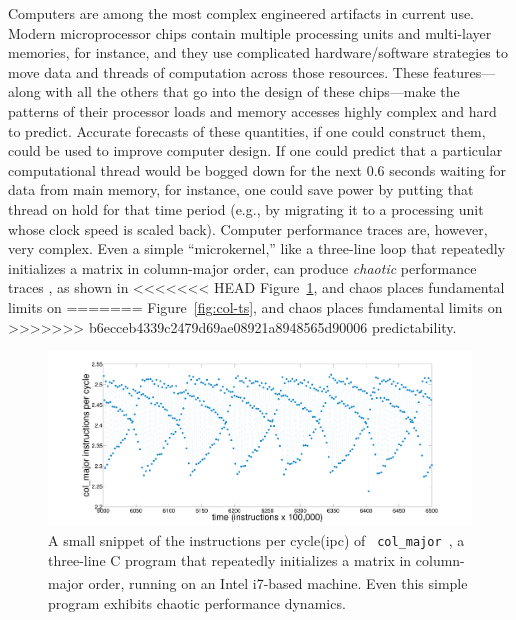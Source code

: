 \documentclass{article}
\newcommand{\col}{{\tt col\_major}~}
\begin{document}
Computers are among the most complex engineered artifacts in current
use.  Modern microprocessor chips contain multiple processing units
and multi-layer memories, for instance, and they use complicated
hardware/software strategies to move data and threads of computation
across those resources.  These features---along with all the others
that go into the design of these chips---make the patterns of their
processor loads and memory accesses highly complex and hard to
predict.  Accurate forecasts of these quantities, if one could
construct them, could be used to improve computer design.  If one
could predict that a particular computational thread would be bogged
down for the next 0.6 seconds waiting for data from main memory, for
instance, one could save power by putting that thread on hold for that
time period (e.g., by migrating it to a processing unit whose clock
speed is scaled back).  Computer performance traces are, however, very
complex.  Even a simple ``microkernel,'' like a three-line loop that
repeatedly initializes a matrix in column-major order, can produce
{\sl chaotic} performance traces \cite{mytkowicz09}, as shown in
<<<<<<< HEAD
Figure~\ref{fig:ipc}, and chaos places fundamental limits on
=======
Figure~\ref{fig:col-ts}, and chaos places fundamental limits on
>>>>>>> b6ecceb4339c2479d69ae08921a8948565d90006
predictability.
%
 \begin{figure}[htbp]
    \centering
    \includegraphics[width=\textwidth]{figs/colshortts}
    \caption{A small snippet of the instructions per cycle(ipc) of {\tt
        \col}, a three-line C program that repeatedly initializes
      a matrix in column-major order, running on an Intel i7\textsuperscript{\textregistered}-based machine.  Even this
      simple program exhibits chaotic performance dynamics.}
   \label{fig:ipc}
  \end{figure}
\end{document}
